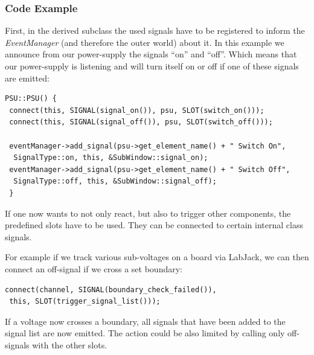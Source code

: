 \documentclass[10pt,a4paper]{article}
\begin{document}
		\subsubsection{Code Example}

		First, in the derived subclass the used signals have to be registered to inform the \textit{EventManager} (and therefore the outer world) about it. In this example we announce from our power-supply the signals \enquote{on} and \enquote{off}. Which means that our power-supply is listening and will turn itself on or off if one of these signals are emitted:
		
\begin{lstlisting}
PSU::PSU() {
 connect(this, SIGNAL(signal_on()), psu, SLOT(switch_on()));
 connect(this, SIGNAL(signal_off()), psu, SLOT(switch_off()));

 eventManager->add_signal(psu->get_element_name() + " Switch On",
  SignalType::on, this, &SubWindow::signal_on);
 eventManager->add_signal(psu->get_element_name() + " Switch Off",
  SignalType::off, this, &SubWindow::signal_off);
 }
\end{lstlisting}

If one now wants to not only react, but also to trigger other components, the predefined slots have to be used. They can be connected to certain internal class signals. 

For example if we track various sub-voltages on a board via LabJack, we can then connect an off-signal if we cross a set boundary:

\begin{lstlisting}
connect(channel, SIGNAL(boundary_check_failed()),
 this, SLOT(trigger_signal_list()));
\end{lstlisting}

If a voltage now crosses a boundary, all signals that have been added to the signal list are now emitted. The action could be also limited by calling only off-signals with the other slots.
\end{document}

